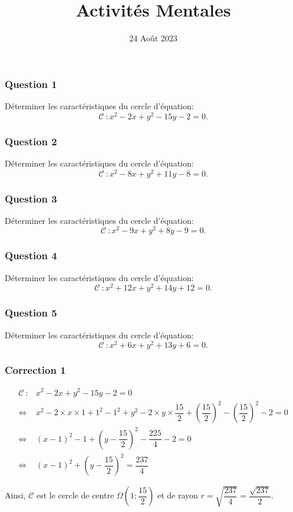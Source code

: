 \documentclass[15pt, mathserif]{beamer}
\title{Activités Mentales}
\date{24 Août 2023}
\begin{document}
\begin{frame}
    \titlepage
\end{frame}

\begin{frame} 
	\frametitle{Question 1}
Déterminer les caractéristiques du cercle d'équation: \[\mathcal{C} ~: x^2-2x + y^2-15y-2= 0.\]\end{frame}


\begin{frame} 
	\frametitle{Question 2}
Déterminer les caractéristiques du cercle d'équation: \[\mathcal{C} ~: x^2-8x + y^2+11y-8= 0.\]\end{frame}


\begin{frame} 
	\frametitle{Question 3}
Déterminer les caractéristiques du cercle d'équation: \[\mathcal{C} ~: x^2-9x + y^2+8y-9= 0.\]\end{frame}


\begin{frame} 
	\frametitle{Question 4}
Déterminer les caractéristiques du cercle d'équation: \[\mathcal{C} ~: x^2+12x + y^2+14y+12= 0.\]\end{frame}


\begin{frame} 
	\frametitle{Question 5}
Déterminer les caractéristiques du cercle d'équation: \[\mathcal{C} ~: x^2+6x + y^2+13y+6= 0.\]\end{frame}


\begin{frame}
\vspace{-10mm}
	\frametitle{Correction 1}
\begin{align*}\mathcal{C} ~: & x^2-2x + y^2-15y-2= 0 \\
	 \Leftrightarrow & x^2-2\times x \times 1+1^2-1^2+y^2-2\times y \times \dfrac{15}{2}+\left(\dfrac{15}{2}\right)^2- \left(\dfrac{15}{2}\right)^2-2= 0 \\
	 \Leftrightarrow & \left( x-1\right)^2-1+\left( y-\dfrac{15}{2}\right)^2-\dfrac{225}{4}-2= 0 \\
	 \Leftrightarrow & \left( x-1\right)^2+\left( y-\dfrac{15}{2}\right)^2 = \dfrac{237}{4}
 \end{align*} 

 \bigskip 

 Ainsi, $\mathcal{C}$ est le cercle de centre $\Omega \left( 1;\dfrac{15}{2}\right)$ et de rayon $r = \sqrt{\dfrac{237}{4}}= \dfrac{\sqrt{237}}{2}$.\end{frame}
\end{document}
